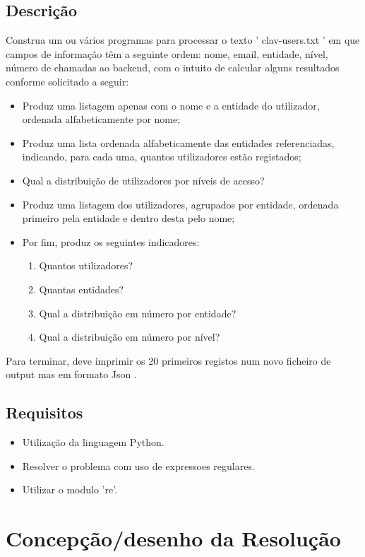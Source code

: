\documentclass[11pt,a4paper]{report}%
\begin{document}
\section{Descrição} \label{sec:Descricao} %
Construa um ou vários programas
para processar o texto ' clav-users.txt ' em que campos de informação
têm a seguinte ordem: nome, email, entidade, nível, número de chamadas ao backend, com o intuito de calcular alguns
resultados conforme solicitado a seguir:
\begin{itemize}
\item Produz uma listagem apenas com o nome e a entidade do utilizador, ordenada alfabeticamente por nome;
\item Produz uma lista ordenada alfabeticamente das entidades referenciadas, indicando, para cada uma, quantos utilizadores estão registados;
\item Qual a distribuição de utilizadores por níveis de acesso?
\item Produz uma listagem dos utilizadores, agrupados por entidade, ordenada primeiro pela entidade e dentro desta pelo nome;
\item Por fim, produz os seguintes indicadores:
\begin{enumerate}[1.]
\item Quantos utilizadores?
\item Quantas entidades?
\item Qual a distribuição em número por entidade?
\item Qual a distribuição em número por nível?
\end{enumerate}
\end{itemize}
Para terminar, deve imprimir os 20 primeiros registos num novo ficheiro de output mas em formato Json .

\section{Requisitos} \label{sec:Requesitos}
\begin{itemize}
  \item Utilização da linguagem Python.
  \item Resolver o problema com uso de expressoes regulares.
  \item Utilizar o modulo 're'.
\end{itemize}


\chapter{Concepção/desenho da Resolução}
\end{document}
